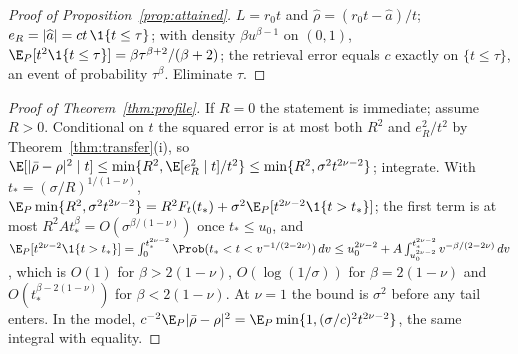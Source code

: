 \begin{proof}[Proof of Proposition~\ref{prop:attained}]
$L=r_0t$ and $\widehat\rho=(r_0t-\widehat a)/t$; $e_R=|\widehat a|=ct\,\1\{t\le\tau\}$; with density
$\beta u^{\beta-1}$ on $(0,1)$, $\E_P[t^2\1\{t\le\tau\}]=\beta\tau^{\beta+2}/(\beta+2)$; the retrieval error equals
$c$ exactly on $\{t\le\tau\}$, an event of probability $\tau^\beta$. Eliminate $\tau$.
\end{proof}

\begin{proof}[Proof of Theorem~\ref{thm:profile}]
If $R=0$ the statement is immediate; assume $R>0$. Conditional on $t$ the squared error is at most both $R^2$ and $e_R^2/t^2$ by Theorem~\ref{thm:transfer}(i), so
$\E[|\bar\rho-\rho|^2\mid t]\le\min\{R^2,\E[e_R^2\mid t]/t^2\}\le\min\{R^2,\sigma^2t^{2\nu-2}\}$; integrate. With
$t_*=(\sigma/R)^{1/(1-\nu)}$,
$\E_P\min\{R^2,\sigma^2t^{2\nu-2}\}=R^2F_t(t_*)+\sigma^2\E_P[t^{2\nu-2}\1\{t>t_*\}]$; the first term is at most
$R^2At_*^\beta=O(\sigma^{\beta/(1-\nu)})$ once $t_*\le u_0$, and
$\E_P[t^{2\nu-2}\1\{t>t_*\}]=\int_0^{t_*^{2\nu-2}}\Prob(t_*<t<v^{-1/(2-2\nu)})\,dv
\le u_0^{2\nu-2}+A\int_{u_0^{2\nu-2}}^{t_*^{2\nu-2}}v^{-\beta/(2-2\nu)}\,dv$, which is $O(1)$ for
$\beta>2(1-\nu)$, $O(\log(1/\sigma))$ for $\beta=2(1-\nu)$ and $O(t_*^{\beta-2(1-\nu)})$ for $\beta<2(1-\nu)$. At
$\nu=1$ the bound is $\sigma^2$ before any tail enters. In the model,
$c^{-2}\E_P|\bar\rho-\rho|^2=\E_P\min\{1,(\sigma/c)^2t^{2\nu-2}\}$, the same integral with equality.
\end{proof}

